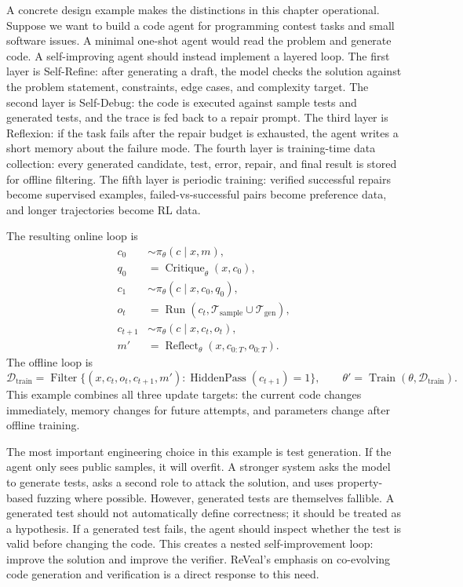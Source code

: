 A concrete design example makes the distinctions in this chapter operational. Suppose we want to build a code agent for programming contest tasks and small software issues. A minimal one-shot agent would read the problem and generate code. A self-improving agent should instead implement a layered loop. The first layer is Self-Refine: after generating a draft, the model checks the solution against the problem statement, constraints, edge cases, and complexity target. The second layer is Self-Debug: the code is executed against sample tests and generated tests, and the trace is fed back to a repair prompt. The third layer is Reflexion: if the task fails after the repair budget is exhausted, the agent writes a short memory about the failure mode. The fourth layer is training-time data collection: every generated candidate, test, error, repair, and final result is stored for offline filtering. The fifth layer is periodic training: verified successful repairs become supervised examples, failed-vs-successful pairs become preference data, and longer trajectories become RL data.

The resulting online loop is
\begin{align}
    c_0 &\sim \pi_\theta(c\mid x,m),\\
    q_0 &= \operatorname{Critique}_\theta(x,c_0),\\
    c_1 &\sim \pi_\theta(c\mid x,c_0,q_0),\\
    o_t &= \operatorname{Run}(c_t,\mathcal{T}_{\mathrm{sample}}\cup\mathcal{T}_{\mathrm{gen}}),\\
    c_{t+1} &\sim \pi_\theta(c\mid x,c_t,o_t),\\
    m' &= \operatorname{Reflect}_\theta(x,c_{0:T},o_{0:T}).
\end{align}
The offline loop is
\begin{equation}
    \mathcal{D}_{\mathrm{train}}=\operatorname{Filter}\{(x,c_t,o_t,c_{t+1},m'):\operatorname{HiddenPass}(c_{t+1})=1\},
    \qquad
    \theta' = \operatorname{Train}(\theta,\mathcal{D}_{\mathrm{train}}).
\end{equation}
This example combines all three update targets: the current code changes immediately, memory changes for future attempts, and parameters change after offline training.

The most important engineering choice in this example is test generation. If the agent only sees public samples, it will overfit. A stronger system asks the model to generate tests, asks a second role to attack the solution, and uses property-based fuzzing where possible. However, generated tests are themselves fallible. A generated test should not automatically define correctness; it should be treated as a hypothesis. If a generated test fails, the agent should inspect whether the test is valid before changing the code. This creates a nested self-improvement loop: improve the solution and improve the verifier. ReVeal's emphasis on co-evolving code generation and verification is a direct response to this need.

